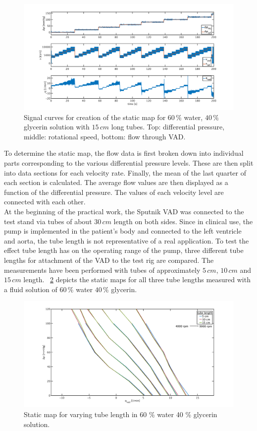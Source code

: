 \begin{figure}[ht]
  \centering
  \includegraphics[width=\textwidth]{images/chapt_4/Test_60w40g_long.pdf}
  \caption[Signal curves for creation of the static map.]{Signal curves for creation of the static map for $60\,\%$ water, $40\,\%$ glycerin solution with $15 \, cm$ long tubes. Top: differential pressure, middle: rotational speed, bottom: flow through VAD.}
  \label{fig:test_60w40g_long}
\end{figure}
To determine the static map, the flow data is first broken down into individual parts corresponding to the various differential pressure levels.  These are then split into data sections for each velocity rate. Finally, the mean of the last quarter of each section is calculated. The average flow values are then displayed as a function of the differential pressure. The values of each velocity level are connected with each other.
\\At the beginning of the practical work, the Sputnik VAD was connected to the test stand via tubes of about $30\, cm$ length on both sides. Since in clinical use, the pump is implemented in the patient's body and connected to the left ventricle and aorta, the tube length is not representative of a real application. To test the effect tube length has on the operating range of the pump, three different tube lengths for attachment of the VAD to the test rig are compared. The measurements have been performed with tubes of approximately $5\, cm$, $10\, cm$ and $15\, cm$ length. \figurename~\ref{fig:60w_40g} depicts the static maps for all three tube lengths measured with a fluid solution of $60\, \%$ water $40\, \%$ glycerin.
\begin{figure}[ht]
  \centering
  \includegraphics[width=\textwidth]{images/chapt_4/60w40g_tube_length_new.pdf}
  \caption[Static map for different tube length in 60 \% water 40 \% glycerin solution]{Static map for varying tube length in 60 \% water 40 \% glycerin solution.}
  \label{fig:60w_40g}
\end{figure}
